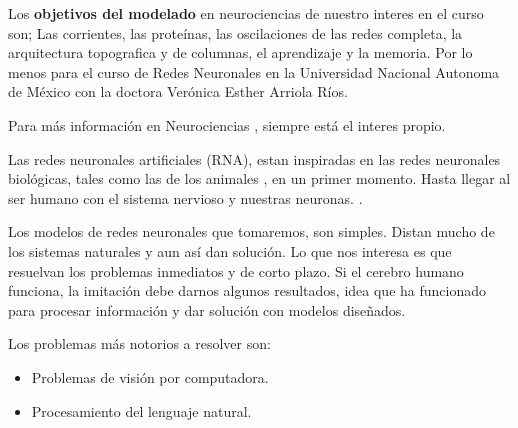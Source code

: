 Los \textbf{objetivos del modelado} en neurociencias de nuestro interes en el curso son; Las corrientes, las proteínas, las oscilaciones de las redes completa, la arquitectura topografica y de columnas, el aprendizaje y la memoria. Por lo menos para el curso de Redes Neuronales en la Universidad Nacional Autonoma de México con la doctora Verónica Esther Arriola Ríos.

Para más información en Neurociencias \cite{princNS5}, siempre está el interes propio.

Las redes neuronales artificiales (RNA), estan inspiradas en las redes neuronales biológicas, tales como las de los animales \cite{incipiencias}, en un primer momento. Hasta llegar al ser humano con el sistema nervioso y nuestras neuronas. \cite{ideaNeurona}. 

Los modelos de redes neuronales que tomaremos, son simples. Distan mucho de los sistemas naturales y aun así dan solución. Lo que nos interesa es que resuelvan los problemas inmediatos y de corto plazo. Si el cerebro humano funciona, la imitación debe darnos algunos resultados, idea que ha funcionado para procesar información y dar solución con modelos diseñados. 

Los problemas más notorios a resolver son: 
\begin{itemize}
\item Problemas de visión por computadora.
\item Procesamiento del lenguaje natural.
\end{itemize}
